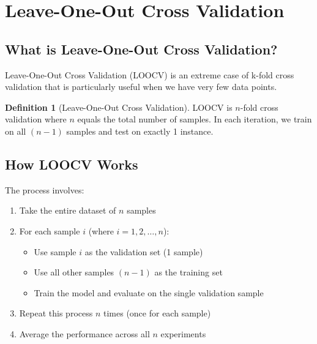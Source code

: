 \documentclass[11pt,a4paper]{article}
\theoremstyle{definition}
\newtheorem{definition}{Definition}[section]
\theoremstyle{plain}
\theoremstyle{remark}
\begin{document}
\section{Leave-One-Out Cross Validation}

\subsection{What is Leave-One-Out Cross Validation?}

Leave-One-Out Cross Validation (LOOCV) is an extreme case of k-fold cross validation that is particularly useful when we have very few data points.

\begin{definition}[Leave-One-Out Cross Validation]
LOOCV is $n$-fold cross validation where $n$ equals the total number of samples. In each iteration, we train on all $(n-1)$ samples and test on exactly 1 instance.
\end{definition}

\subsection{How LOOCV Works}

The process involves:

\begin{enumerate}
    \item Take the entire dataset of $n$ samples
    \item For each sample $i$ (where $i = 1, 2, \ldots, n$):
    \begin{itemize}
        \item Use sample $i$ as the validation set (1 sample)
        \item Use all other samples $(n-1)$ as the training set
        \item Train the model and evaluate on the single validation sample
    \end{itemize}
    \item Repeat this process $n$ times (once for each sample)
    \item Average the performance across all $n$ experiments
\end{enumerate}
\end{document}
